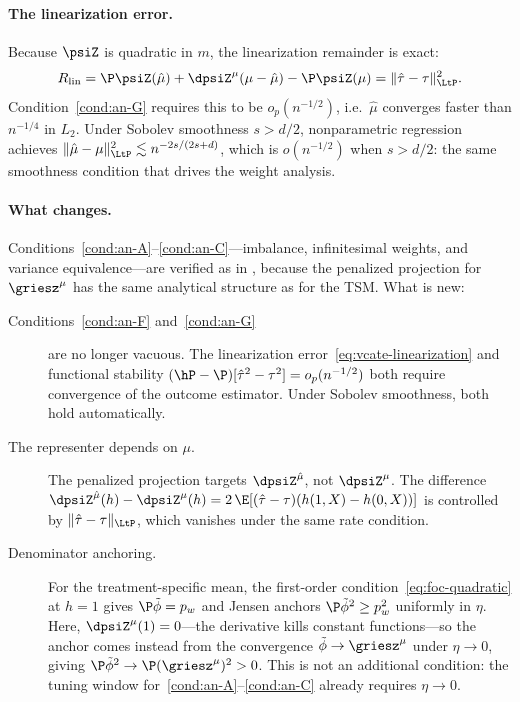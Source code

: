 \documentclass{article}
\begin{document}
\paragraph{The linearization error.}
Because $\psiZ$ is quadratic in $m$,
the linearization remainder is exact:
\begin{equation}\label{eq:vcate-linearization}
R_{\mathrm{lin}}
  = \P\psiZ(\hat\mu)
    + \dpsiZ^\mu(\mu - \hat\mu)
    - \P\psiZ(\mu)
  = \|\hat\tau - \tau\|_{\LtP}^2.
\end{equation}
Condition~\ref{cond:an-G} requires this to be
$o_p(n^{-1/2})$,
i.e.\ $\hat\mu$ converges
faster than $n^{-1/4}$ in $L_2$.
Under Sobolev smoothness $s > d/2$,
nonparametric regression achieves
$\|\hat\mu - \mu\|_{\LtP}^2
  \lesssim n^{-2s/(2s+d)}$,
which is $o(n^{-1/2})$
when $s > d/2$:
the same smoothness condition
that drives the weight analysis.

\paragraph{What changes.}
Conditions~\ref{cond:an-A}--\ref{cond:an-C}---imbalance,
infinitesimal weights,
and variance equivalence---are
verified as in
,
because the penalized projection
for $\griesz^\mu$
has the same analytical structure
as for the TSM.
What is new:
\begin{description}
\item[Conditions~\ref{cond:an-F} and~\ref{cond:an-G}]
are no longer vacuous.
The linearization error~\eqref{eq:vcate-linearization}
and functional stability
$(\hP - \P)[\hat\tau^2 - \tau^2]
  = o_p(n^{-1/2})$
both require convergence
of the outcome estimator.
Under Sobolev smoothness,
both hold automatically.
\item[The representer depends on $\mu$.]
The penalized projection targets
$\dpsiZ^{\hat\mu}$,
not $\dpsiZ^\mu$.
The difference
$\dpsiZ^{\hat\mu}(h) - \dpsiZ^\mu(h)
  = 2\,\E[(\hat\tau - \tau)(h(1,X) - h(0,X))]$
is controlled by
$\|\hat\tau - \tau\|_{\LtP}$,
which vanishes under the same
rate condition.
\item[Denominator anchoring.]
For the treatment-specific mean,
the first-order condition~\eqref{eq:foc-quadratic} at $h = 1$
gives $\P\tilde\phi = p_w$
and Jensen anchors $\P\tilde\phi^2 \ge p_w^2$
uniformly in $\eta$.
Here, $\dpsiZ^\mu(1) = 0$---the
derivative kills constant functions---so
the anchor comes instead
from the convergence
$\tilde\phi \to \griesz^\mu$
under $\eta \to 0$,
giving $\P\tilde\phi^2 \to \P(\griesz^\mu)^2 > 0$.
This is not an additional condition:
the tuning window for~\ref{cond:an-A}--\ref{cond:an-C}
already requires $\eta \to 0$.
\end{description}
\end{document}
